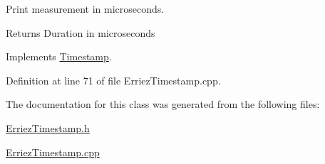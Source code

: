 Print measurement in microseconds. 

\begin{DoxyReturn}{Returns}
Duration in microseconds 
\end{DoxyReturn}


Implements \hyperlink{class_timestamp_a351537b95385937a004ab32b6b3743f7}{Timestamp}.



Definition at line 71 of file Erriez\+Timestamp.\+cpp.



The documentation for this class was generated from the following files\+:\begin{DoxyCompactItemize}
\item 
\hyperlink{_erriez_timestamp_8h}{Erriez\+Timestamp.\+h}\item 
\hyperlink{_erriez_timestamp_8cpp}{Erriez\+Timestamp.\+cpp}\end{DoxyCompactItemize}
